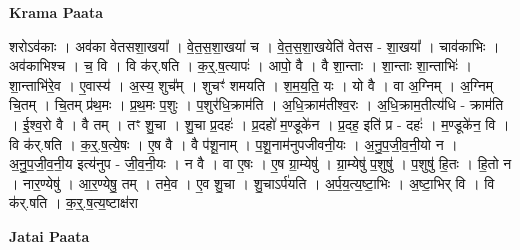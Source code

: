 \documentclass[17pt]{extarticle}
\begin{document}
\textbf{Krama Paata} \newline

शरोऽव॑काः । अव॑का वेतसशा॒खया᳚ । वे॒त॒स॒शा॒खया॑ च । वे॒त॒स॒शा॒खयेति॑ वेतस - शा॒खया᳚ । चाव॑काभिः । अव॑काभिश्च । च॒ वि । वि क॑र्.षति । क॒र्॒.ष॒त्यापः॑ । आपो॒ वै । वै शा॒न्ताः । शा॒न्ताः शा॒न्ताभिः॑ । शा॒न्ताभि॑रे॒व । ए॒वास्य॑ । अ॒स्य॒ शुच᳚म् । शुचꣳ॑ शमयति । श॒म॒य॒ति॒ यः । यो वै । वा अ॒ग्निम् । अ॒ग्निम् चि॒तम् । चि॒तम् प्र॑थ॒मः । प्र॒थ॒मः प॒शुः । प॒शुर॑धि॒क्राम॑ति । अ॒धि॒क्राम॑तीश्व॒रः । अ॒धि॒क्राम॒तीत्य॑धि - क्राम॑ति । ई॒श्व॒रो वै । वै तम् । तꣳ शु॒चा । शु॒चा प्र॒दहः॑ । प्र॒दहो॑ म॒ण्डूके॑न । प्र॒दह॒ इति॑ प्र - दहः॑ । म॒ण्डूके॑न॒ वि । वि क॑र्.षति । क॒र्॒.ष॒त्ये॒षः । ए॒ष वै । वै प॑शू॒नाम् । प॒शू॒नाम॑नुपजीवनी॒यः । अ॒नु॒प॒जी॒व॒नी॒यो न । अ॒नु॒प॒जी॒व॒नी॒य इत्य॑नुप - जी॒व॒नी॒यः । न वै । वा ए॒षः । ए॒ष ग्रा॒म्येषु॑ । ग्रा॒म्येषु॑ प॒शुषु॑ । प॒शुषु॑ हि॒तः । हि॒तो न । नार॒ण्येषु॑ । आ॒र॒ण्येषु॒ तम् । तमे॒व । ए॒व शु॒चा । शु॒चाऽर्प॑यति । अ॒र्प॒य॒त्य॒ष्टा॒भिः । अ॒ष्टा॒भिर् वि । वि क॑र्.षति । क॒र्॒.ष॒त्य॒ष्टाक्ष॑रा \newline

\textbf{Jatai Paata} \newline
\end{document}
